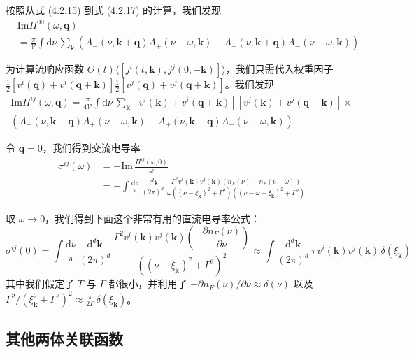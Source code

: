 按照从式 (4.2.15) 到式 (4.2.17) 的计算，我们发现
\begin{align*}
&\mathrm{Im}\Pi^{00}(\omega,\pmb{q}) \tag{4.3.16}\\
&= \frac{\pi}{\mathcal{V}}\int \mathrm{d}\nu\, \sum_{\pmb{k}}\left(A_-(\nu,\pmb{k}+\pmb{q})A_+(\nu-\omega,\pmb{k}) - A_+(\nu,\pmb{k}+\pmb{q})A_-(\nu-\omega,\pmb{k})\right)
\end{align*}

为计算流响应函数 $\Theta(t)\langle[j^i(t,\pmb{k}),j^j(0,-\pmb{k})]\rangle$，我们只需代入权重因子 $\frac{1}{2}[v^i(\pmb{q})+v^i(\pmb{q}+\pmb{k})]\frac{1}{2}[v^j(\pmb{q})+v^j(\pmb{q}+\pmb{k})]$。我们发现
\begin{align*}
\mathrm{Im}\Pi^{ij}(\omega,\pmb{q}) = \frac{\pi}{4\mathcal{V}}\int \mathrm{d}\nu\, \sum_{\pmb{k}} \left[v^i(\pmb{k})+v^i(\pmb{q}+\pmb{k})\right]\left[v^j(\pmb{k})+v^j(\pmb{q}+\pmb{k})\right]\times\\
\left(A_-(\nu,\pmb{k}+\pmb{q})A_+(\nu-\omega,\pmb{k}) - A_+(\nu,\pmb{k}+\pmb{q})A_-(\nu-\omega,\pmb{k})\right)
\end{align*}

令 $\pmb{q}=0$，我们得到交流电导率
\begin{align*}
\sigma^{ij}(\omega) &= -\mathrm{Im}\,\frac{\Pi^{ij}(\omega,0)}{\omega}\\
&= -\int \frac{\mathrm{d}\nu}{\pi}\, \frac{\mathrm{d}^d\pmb{k}}{(2\pi)^d}\, \frac{\Gamma^2 v^i(\pmb{k})v^j(\pmb{k})\left(n_F(\nu)-n_F(\nu-\omega)\right)}{\omega\left((\nu-\xi_{\pmb{k}})^2+\Gamma^2\right)\left((\nu-\omega-\xi_{\pmb{k}})^2+\Gamma^2\right)}
\end{align*}

取 $\omega\to 0$，我们得到下面这个非常有用的直流电导率公式：
\begin{equation*}
\sigma^{ij}(0) = \int \frac{\mathrm{d}\nu}{\pi}\, \frac{\mathrm{d}^d\pmb{k}}{(2\pi)^d}\,
\frac{\Gamma^2 v^i(\pmb{k}) v^j(\pmb{k}) \left(-\dfrac{\partial n_F(\nu)}{\partial \nu}\right)}
{\left((\nu - \xi_{\pmb{k}})^2 + \Gamma^2\right)^2}
\approx \int \frac{\mathrm{d}^d\pmb{k}}{(2\pi)^d}\, \tau\, v^i(\pmb{k}) v^j(\pmb{k})\, \delta(\xi_{\pmb{k}})
\end{equation*}
其中我们假定了 $T$ 与 $\Gamma$ 都很小，并利用了 $-\partial n_F(\nu)/\partial\nu \approx \delta(\nu)$
以及 $\Gamma^2/(\xi_{\pmb{k}}^2 + \Gamma^2)^2 \approx \frac{\pi}{2\Gamma}\,\delta(\xi_{\pmb{k}})$。

\subsection{其他两体关联函数}

